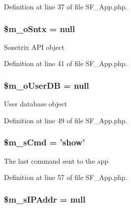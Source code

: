 Definition at line 37 of file SF\_\-App.php.

\hypertarget{classSF__App_a22d1091f94c58e3533304abe3eb9e9fe}{
\subsubsection[{\$m\_\-oSntx}]{\setlength{\rightskip}{0pt plus 5cm}\$m\_\-oSntx = null}}
\label{classSF__App_a22d1091f94c58e3533304abe3eb9e9fe}
Sonetrix API object 

Definition at line 41 of file SF\_\-App.php.

\hypertarget{classSF__App_a480a834e33015cc9a001d1d84972bb12}{
\subsubsection[{\$m\_\-oUserDB}]{\setlength{\rightskip}{0pt plus 5cm}\$m\_\-oUserDB = null}}
\label{classSF__App_a480a834e33015cc9a001d1d84972bb12}
User database object 

Definition at line 49 of file SF\_\-App.php.

\hypertarget{classSF__App_a21ffd6ebc459ccba9514cbaee05b2ece}{
\subsubsection[{\$m\_\-sCmd}]{\setlength{\rightskip}{0pt plus 5cm}\$m\_\-sCmd = 'show'}}
\label{classSF__App_a21ffd6ebc459ccba9514cbaee05b2ece}
The last command sent to the app 

Definition at line 57 of file SF\_\-App.php.

\hypertarget{classSF__App_a2db945fecc9d0f95e19093d7829be78d}{
\subsubsection[{\$m\_\-sIPAddr}]{\setlength{\rightskip}{0pt plus 5cm}\$m\_\-sIPAddr = null}}
\label{classSF__App_a2db945fecc9d0f95e19093d7829be78d}


